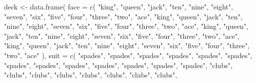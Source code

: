 \documentclass[
]{memoir}
\newenvironment{Shaded}{\begin{snugshade}}{\end{snugshade}}
\newcommand{\AttributeTok}[1]{\textcolor[rgb]{0.77,0.63,0.00}{#1}}
\newcommand{\FunctionTok}[1]{\textcolor[rgb]{0.00,0.00,0.00}{#1}}
\newcommand{\NormalTok}[1]{#1}
\newcommand{\OtherTok}[1]{\textcolor[rgb]{0.56,0.35,0.01}{#1}}
\newcommand{\StringTok}[1]{\textcolor[rgb]{0.31,0.60,0.02}{#1}}
\theoremstyle{definition}
\theoremstyle{definition}
\theoremstyle{definition}
\theoremstyle{definition}
\theoremstyle{remark}
\begin{document}
\begin{Shaded}
\begin{Highlighting}[]
\NormalTok{deck }\OtherTok{\textless{}{-}} \FunctionTok{data.frame}\NormalTok{(}
  \AttributeTok{face =} \FunctionTok{c}\NormalTok{(}
    \StringTok{"king"}\NormalTok{, }\StringTok{"queen"}\NormalTok{, }\StringTok{"jack"}\NormalTok{, }\StringTok{"ten"}\NormalTok{, }\StringTok{"nine"}\NormalTok{, }\StringTok{"eight"}\NormalTok{,}
    \StringTok{"seven"}\NormalTok{, }\StringTok{"six"}\NormalTok{, }\StringTok{"five"}\NormalTok{, }\StringTok{"four"}\NormalTok{, }\StringTok{"three"}\NormalTok{, }\StringTok{"two"}\NormalTok{, }\StringTok{"ace"}\NormalTok{,}
    \StringTok{"king"}\NormalTok{, }\StringTok{"queen"}\NormalTok{, }\StringTok{"jack"}\NormalTok{, }\StringTok{"ten"}\NormalTok{, }\StringTok{"nine"}\NormalTok{, }\StringTok{"eight"}\NormalTok{, }\StringTok{"seven"}\NormalTok{,}
    \StringTok{"six"}\NormalTok{, }\StringTok{"five"}\NormalTok{, }\StringTok{"four"}\NormalTok{, }\StringTok{"three"}\NormalTok{, }\StringTok{"two"}\NormalTok{, }\StringTok{"ace"}\NormalTok{, }\StringTok{"king"}\NormalTok{,}
    \StringTok{"queen"}\NormalTok{, }\StringTok{"jack"}\NormalTok{, }\StringTok{"ten"}\NormalTok{, }\StringTok{"nine"}\NormalTok{, }\StringTok{"eight"}\NormalTok{, }\StringTok{"seven"}\NormalTok{, }\StringTok{"six"}\NormalTok{,}
    \StringTok{"five"}\NormalTok{, }\StringTok{"four"}\NormalTok{, }\StringTok{"three"}\NormalTok{, }\StringTok{"two"}\NormalTok{, }\StringTok{"ace"}\NormalTok{, }\StringTok{"king"}\NormalTok{, }\StringTok{"queen"}\NormalTok{,}
    \StringTok{"jack"}\NormalTok{, }\StringTok{"ten"}\NormalTok{, }\StringTok{"nine"}\NormalTok{, }\StringTok{"eight"}\NormalTok{, }\StringTok{"seven"}\NormalTok{, }\StringTok{"six"}\NormalTok{, }\StringTok{"five"}\NormalTok{,}
    \StringTok{"four"}\NormalTok{, }\StringTok{"three"}\NormalTok{, }\StringTok{"two"}\NormalTok{, }\StringTok{"ace"}
\NormalTok{  ),}
  \AttributeTok{suit =} \FunctionTok{c}\NormalTok{(}
    \StringTok{"spades"}\NormalTok{, }\StringTok{"spades"}\NormalTok{, }\StringTok{"spades"}\NormalTok{, }\StringTok{"spades"}\NormalTok{,}
    \StringTok{"spades"}\NormalTok{, }\StringTok{"spades"}\NormalTok{, }\StringTok{"spades"}\NormalTok{, }\StringTok{"spades"}\NormalTok{, }\StringTok{"spades"}\NormalTok{,}
    \StringTok{"spades"}\NormalTok{, }\StringTok{"spades"}\NormalTok{, }\StringTok{"spades"}\NormalTok{, }\StringTok{"spades"}\NormalTok{, }\StringTok{"clubs"}\NormalTok{, }\StringTok{"clubs"}\NormalTok{,}
    \StringTok{"clubs"}\NormalTok{, }\StringTok{"clubs"}\NormalTok{, }\StringTok{"clubs"}\NormalTok{, }\StringTok{"clubs"}\NormalTok{, }\StringTok{"clubs"}\NormalTok{, }\StringTok{"clubs"}\NormalTok{,}

\end{Highlighting}
\end{Shaded}
\end{document}
